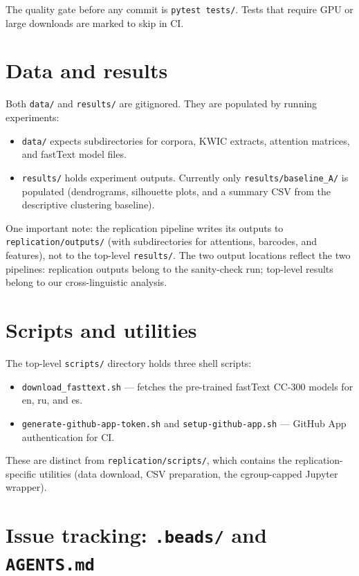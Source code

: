 The quality gate before any commit is \texttt{pytest tests/}. Tests that require GPU or large downloads are marked to skip in CI.

\section{Data and results}
\label{sec:data-results}

Both \texttt{data/} and \texttt{results/} are gitignored. They are populated by running experiments:

\begin{itemize}
  \item \texttt{data/} expects subdirectories for corpora, KWIC extracts, attention matrices, and fastText model files.
  \item \texttt{results/} holds experiment outputs. Currently only \texttt{results/baseline\_A/} is populated (dendrograms, silhouette plots, and a summary CSV from the descriptive clustering baseline).
\end{itemize}

One important note: the replication pipeline writes its outputs to \texttt{replication/outputs/} (with subdirectories for attentions, barcodes, and features), not to the top-level \texttt{results/}. The two output locations reflect the two pipelines: replication outputs belong to the sanity-check run; top-level results belong to our cross-linguistic analysis.

\section{Scripts and utilities}
\label{sec:scripts}

The top-level \texttt{scripts/} directory holds three shell scripts:

\begin{itemize}
  \item \texttt{download\_fasttext.sh} --- fetches the pre-trained fastText CC-300 models for en, ru, and es.
  \item \texttt{generate-github-app-token.sh} and \texttt{setup-github-app.sh} --- GitHub App authentication for CI.
\end{itemize}

These are distinct from \texttt{replication/scripts/}, which contains the replication-specific utilities (data download, CSV preparation, the cgroup-capped Jupyter wrapper).

\section{Issue tracking: \texttt{.beads/} and \texttt{AGENTS.md}}
\label{sec:beads}

